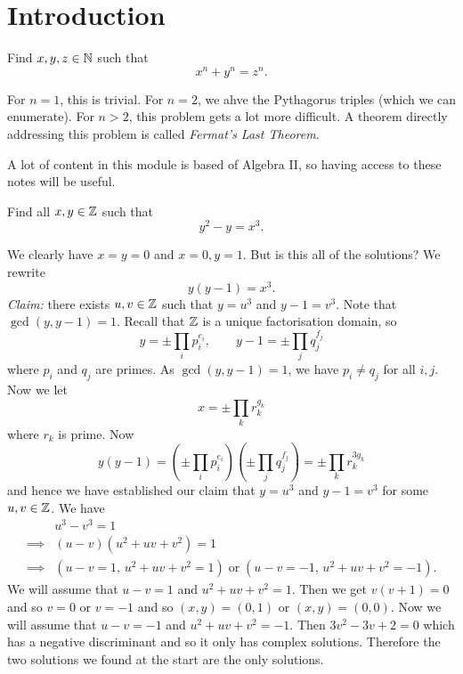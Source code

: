 
\section{Introduction}

\begin{problem}
	Find $x,y,z \in \mathbb{N}$ such that \[
		x^n + y^n = z^n.
	\]
\end{problem}

\begin{solution}
	For $n = 1$, this is trivial.
	For $n = 2$, we ahve the Pythagorus triples (which we can enumerate).
	For $n > 2$, this problem gets a lot more difficult. A theorem directly
	addressing this problem is called \emph{Fermat's Last Theorem}.
\end{solution}

A lot of content in this module is based of Algebra II, 
so having access to these notes will be useful.

\begin{problem}
	Find all $x, y \in \mathbb{Z}$ such that \[
		y^2 - y = x^3.
	\]
\end{problem}

\begin{solution}
	We clearly have $x = y = 0$ and $x = 0, y = 1$.
	But is this all of the solutions?
	We rewrite \[
		y(y - 1) = x^3.
	\]
	\emph{Claim:} there exists $u, v \in \mathbb{Z}$ such that
	$y = u^3$ and $y - 1 = v^3$.
	Note that $\gcd(y,y-1)=1$.
	Recall that $\mathbb{Z}$ is a unique factorisation domain, so \[
		y = \pm \prod_i p_i^{e_i}, \qquad y - 1 = \pm \prod_j q_j^{f_j}
	\]
	where $p_i$ and $q_j$ are primes.
	As $\gcd(y,y-1) = 1$, we have $p_i \neq q_j$ for all $i,j$. 
	Now we let \[
		x = \pm \prod_k r_k^{g_k}
	\]
	where $r_k$ is prime.
	Now \[
		y(y-1) = 
		\left( 
			\pm \prod_i p_i^{e_i} 
		\right) 
		\left( 
			\pm \prod_j q_j^{f_j} 
		\right) 
		= \pm \prod_k r_k^{3g_k}
	\]
	and hence we have established our claim that
	$y = u^3$ and $y - 1 = v^3$ for some $u,v \in \mathbb{Z}$.
	We have
	\begin{align*}
		        & u^3 - v^3 = 1 \\
		\implies& (u - v)(u^2 + uv + v^2) = 1 \\
		\implies& (u - v = 1,\, u^2 + uv + v^2 = 1) 
		\;\text{or}\; 
		(u - v = -1,\, u^2 + uv + v^2 = -1).
	\end{align*}
	We will assume that $u - v = 1$ and $u^2 + uv + v^2 = 1$.
	Then we get $v(v+1) = 0$ and so $v = 0$ or $v = -1$ and so $(x,y) = (0,1)$
	or $(x,y) = (0,0)$.
	Now we will assume that $u - v = -1$ and $u^2 + uv + v^2 = -1$.
	Then $3v^2 - 3v + 2 = 0$ which has a negative discriminant and so it only has
	complex solutions.
	Therefore the two solutions we found at the start are the only solutions.
\end{solution}

